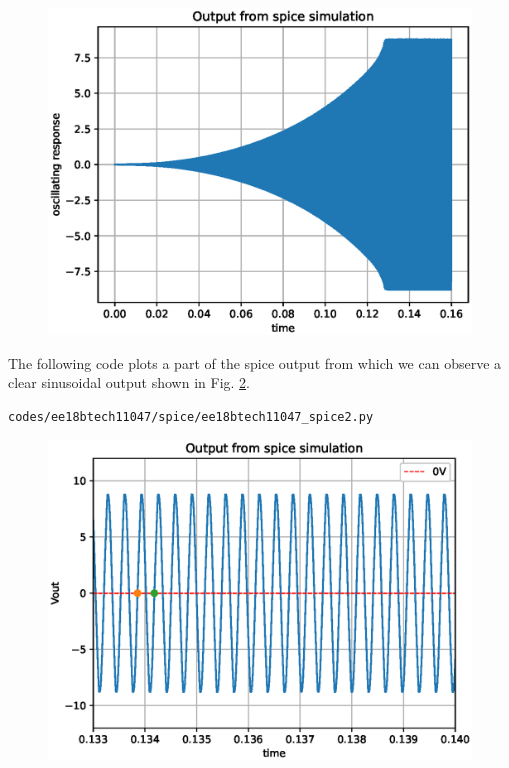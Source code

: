 \begin{enumerate}[label=\arabic*.,ref=\theenumi]
\begin{figure}[!ht]
\includegraphics[width=\columnwidth]{./figs/ee18btech11047/ee18btech11047_spice.eps}
\caption{}
\label{fig:ee18btech11047_spice}
\end{figure}
%
The following code plots a part of the spice output from which we can observe a clear sinusoidal output shown in Fig. \ref{fig:ee18btech11047_spice2}.
\begin{lstlisting}
codes/ee18btech11047/spice/ee18btech11047_spice2.py
\end{lstlisting}
\begin{figure}[!ht]
\centering
\includegraphics[width=\columnwidth]{./figs/ee18btech11047/ee18btech11047_spice2.eps}
\caption{}
\label{fig:ee18btech11047_spice2}
\end{figure}

\end{enumerate}
